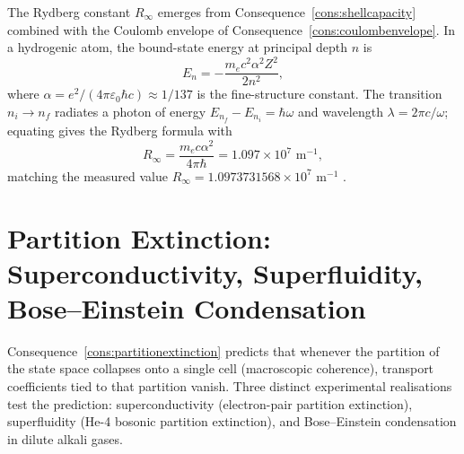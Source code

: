 \documentclass[11pt,twocolumn,a4paper]{article}
\theoremstyle{axiomstyle}
\theoremstyle{conseqstyle}
\theoremstyle{definition}
\theoremstyle{remark}
\begin{document}
The Rydberg constant $R_{\infty}$ emerges from Consequence~\ref{cons:shellcapacity} combined with the Coulomb envelope of Consequence~\ref{cons:coulombenvelope}. In a hydrogenic atom, the bound-state energy at principal depth $n$ is
\begin{equation}
E_{n}=-\frac{m_{e}c^{2}\alpha^{2}Z^{2}}{2n^{2}},
\label{eq:hydrogenE}
\end{equation}
where $\alpha=e^{2}/(4\pi\varepsilon_{0}\hbar c)\approx 1/137$ is the fine-structure constant. The transition $n_{i}\to n_{f}$ radiates a photon of energy $E_{n_{f}}-E_{n_{i}}=\hbar\omega$ and wavelength $\lambda=2\pi c/\omega$; equating gives the Rydberg formula with
\begin{equation*}
R_{\infty}=\frac{m_{e}c\alpha^{2}}{4\pi\hbar}=1.097\times 10^{7}\text{ m}^{-1},
\end{equation*}
matching the measured value $R_{\infty}=1.0973731568\times 10^{7}$ m$^{-1}$ \citep{codata2018}.

\section{Partition Extinction: Superconductivity, Superfluidity, Bose--Einstein Condensation}
\label{sec:partitionextinctionvalidation}

Consequence~\ref{cons:partitionextinction} predicts that whenever the partition of the state space collapses onto a single cell (macroscopic coherence), transport coefficients tied to that partition vanish. Three distinct experimental realisations test the prediction: superconductivity (electron-pair partition extinction), superfluidity (He-4 bosonic partition extinction), and Bose--Einstein condensation in dilute alkali gases.
\end{document}

